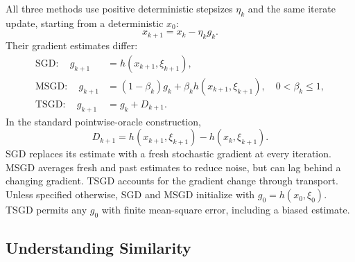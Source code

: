 All three methods use positive deterministic stepsizes $\eta_k$ and
the same iterate update, starting from a deterministic $x_0$:
\begin{equation}
\label{eq:tsgd-iterate}
x_{k+1}=x_k-\eta_k g_k.
\end{equation}
Their gradient estimates differ:
\begin{align}
\mathrm{SGD}:\quad g_{k+1}
  &=h(x_{k+1},\xi_{k+1}), \label{eq:sgd-estimate}\\
\mathrm{MSGD}:\quad g_{k+1}
  &=(1-\beta_k)g_k+\beta_k h(x_{k+1},\xi_{k+1}),
  \quad 0<\beta_k\leq1, \label{eq:msgd-estimate}\\
\mathrm{TSGD}:\quad g_{k+1}
  &=g_k+D_{k+1}. \label{eq:tsgd-estimate}
\end{align}
In the standard pointwise-oracle construction,
\begin{equation}
\label{eq:shared-sample-increment}
D_{k+1}=h(x_{k+1},\xi_{k+1})-h(x_k,\xi_{k+1}).
\end{equation}
SGD replaces its estimate with a fresh stochastic gradient at every
iteration. MSGD averages fresh and past estimates to reduce noise, but
can lag behind a changing gradient. TSGD accounts for the gradient change
through transport.
Unless specified otherwise, SGD and MSGD initialize with
$g_0=h(x_0,\xi_0)$. TSGD permits any $g_0$ with finite mean-square
error, including a biased estimate.

\subsection{Understanding Similarity}
\label{subsec:understanding-similarity}

